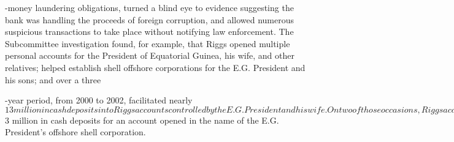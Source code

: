 -money laundering obligations, turned a blind eye to evidence suggesting the bank was handling the proceeds of foreign
corruption, and allowed numerous suspicious transactions to take place without notifying law
enforcement. The Subcommittee investigation found, for example, that Riggs opened multiple
personal accounts for the President of Equatorial Guinea, his wife, and other relatives; helped
establish shell offshore corporations for the E.G. President and his sons; and over a three

-year period, from 2000 to 2002, facilitated nearly $13 million in cash deposits into Riggs accounts
controlled by the E.G. President and his wife. On two of those occasions, Riggs accepted without due
diligence $3 million in cash deposits for an account opened in the name of the E.G. President’s
offshore shell corporation.


